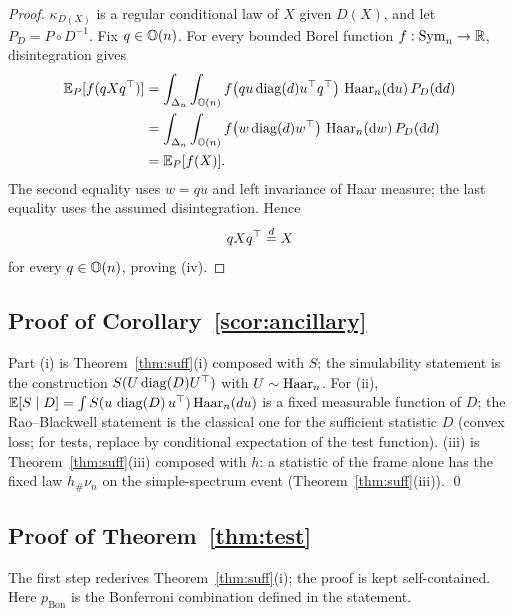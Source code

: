 \begin{proof}
\(\kappa_{D(X)}\) is a regular conditional law of \(X\) given
\(D(X)\), and let \(P_D=P\circ D^{-1}\). Fix \(q\in\mathbb{O}(n)\). For
every bounded Borel function \(f:\mathrm{Sym}_n\to\mathbb R\), disintegration
gives
\[
\begin{aligned}
\mathbb E_P[f(qXq^\top)]
&=
\int_{\Delta_n}
\int_{\mathbb{O}(n)}
f\!\left(
qu\operatorname{diag}(d)u^\top q^\top
\right)
\,\mathrm{Haar}_n(\mathrm{d}u)\,P_D(\mathrm{d}d) \\
&=
\int_{\Delta_n}
\int_{\mathbb{O}(n)}
f\!\left(
w\operatorname{diag}(d)w^\top
\right)
\,\mathrm{Haar}_n(\mathrm{d}w)\,P_D(\mathrm{d}d) \\
&=
\mathbb E_P[f(X)].
\end{aligned}
\]
The second equality uses \(w=qu\) and left invariance of Haar
measure; the last equality uses the assumed disintegration. Hence
\[
qXq^\top\overset{d}{=} X
\]
for every \(q\in\mathbb{O}(n)\), proving (iv).
\end{proof}

\subsection{Proof of Corollary~\ref{scor:ancillary}}

Part (i) is Theorem~\ref{thm:suff}(i) composed with $S$; the
simulability statement is the construction $S(U\operatorname{diag}(D)U^\top)$ with
$U\sim\mathrm{Haar}_n$. For
(ii), $\mathbb{E}[S\mid D]=\int S(u\,\operatorname{diag}(D)\,u^\top)\,\mathrm{Haar}_n(du)$ is a fixed
measurable function of $D$; the Rao--Blackwell statement is the classical
one for the sufficient statistic $D$ \citep[Thm.~1.6.1]
{lehmann2005testing} (convex loss; for tests, replace by conditional
expectation of the test function). (iii) is Theorem~\ref{thm:suff}(iii)
composed with $h$: a statistic of the frame alone has the fixed law $h_\#\nu_n$ on the
simple-spectrum event (Theorem~\ref{thm:suff}(iii)). \qed

\subsection{Proof of Theorem~\ref{thm:test}}

The first step rederives Theorem~\ref{thm:suff}(i); the proof is kept
self-contained. Here $p_{\mathrm{Bon}}$ is the Bonferroni combination
defined in the statement.

